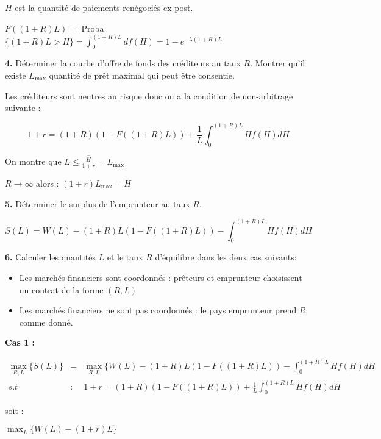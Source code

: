 \documentclass[a4paper]{article}
\begin{document}
$H$ est la quantit\'{e} de paiements ren\'{e}goci\'{e}s ex-post.

$F((1+R)L)=$ Proba$\{(1+R)L>H\}=\int_{0}^{(1+R)L}df(H)=1-e^{-\lambda (1+R)L}$

\textbf{4. }D\'{e}terminer la courbe d'offre de fonds des cr\'{e}diteurs au
taux $R$. Montrer qu'il existe $L_{\max }$ quantit\'{e} de pr\^{e}t maximal
qui peut \^{e}tre consentie.

\bigskip

Les cr\'{e}diteurs sont neutres au risque donc on a la condition de
non-arbitrage suivante :

\begin{equation*}
1+r=(1+R)(1-F((1+R)L))+\frac{1}{L}\int_{0}^{(1+R)L}Hf(H)dH
\end{equation*}

On montre que $L\leq \frac{\overset{-}{H}}{1+r}=L_{\max }$

$R\rightarrow \infty $ alors : $\left( 1+r\right) L_{\max }=\overset{-}{H}$

\textbf{5. }D\'{e}terminer le surplus de l'emprunteur au taux $R$.

\bigskip

\begin{equation*}
S(L)=W(L)-(1+R)L(1-F((1+R)L))-\int_{0}^{(1+R)L}Hf(H)dH
\end{equation*}

\pagebreak

\textbf{6. }Calculer les quantit\'{e}s $L$ et le taux $R$ d'\'{e}quilibre
dans les deux cas suivants:

\begin{itemize}
\item Les march\'{e}s financiers sont coordonn\'{e}s : pr\^{e}teurs et
emprunteur choisissent un contrat de la forme $(R,L)$

\item Les march\'{e}s financiers ne sont pas coordonn\'{e}s : le pays
emprunteur prend $R$ comme donn\'{e}.
\end{itemize}

\textbf{Cas 1 :}

\begin{eqnarray*}
\max_{R,L}\{S(L)\}
&=&\max_{R,L}\{W(L)-(1+R)L(1-F((1+R)L))-\int_{0}^{(1+R)L}Hf(H)dH \\
s.t &:&1+r=(1+R)(1-F((1+R)L))+\frac{1}{L}\int_{0}^{(1+R)L}Hf(H)dH
\end{eqnarray*}

soit :

$\max_{L}\{W(L)-(1+r)L\}$
\end{document}
